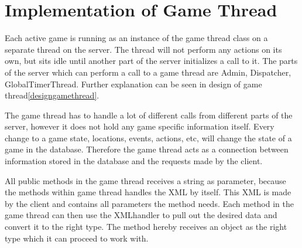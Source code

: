\section{Implementation of Game Thread}
\label{sec:gamethreadimpl}
Each active game is running as an instance of the game thread class on a separate thread on the server. The thread will not perform any actions on its own, but sits idle until another part of the server initializes a call to it. The parts of the server which can perform a call to a game thread are Admin, Dispatcher, GlobalTimerThread. Further explanation can be seen in design of game thread\ref{designgamethread}. 

The game thread has to handle a lot of different calls from different parts of the server, however it does not hold any game specific information itself. Every change to a game state, locations, events, actions, etc, will change the state of a game in the database. Therefore the game thread acts as a connection between information stored in the database and the requests made by the client.

All public methods in the game thread receives a string as parameter, because the methods within game thread handles the XML by itself. This XML is made by the client and contains all parameters the method needs. Each method in the game thread can then use the XMLhandler to pull out the desired data and convert it to the right type. The method hereby receives an object as the right type which it can proceed to work with.

